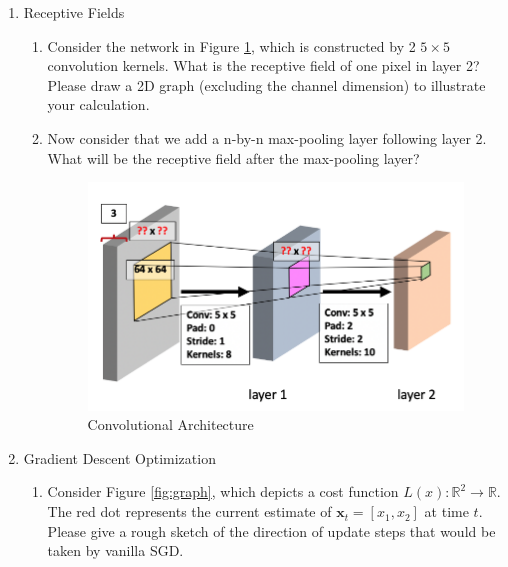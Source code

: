 \documentclass[a4paper]{article}
\begin{document}
\begin{enumerate}
		
		\newpage
		\item Receptive Fields
		\begin{enumerate}
			\item Consider the network in Figure \ref{fig:conv}, which is constructed by 2 $5\times5$ convolution kernels. What is the receptive field of one pixel in layer 2? Please draw a 2D graph (excluding the channel dimension) to illustrate your calculation.
			
			\item Now consider that we add a n-by-n max-pooling layer following layer 2. What will be the receptive field after the max-pooling layer?
			
			\begin{figure}[h]
				\centering
				\includegraphics[scale=0.25]{images/conv.png}
				\caption{Convolutional Architecture}
				\label{fig:conv}
			\end{figure}
			
		\end{enumerate}
		
		\newpage
		\item Gradient Descent Optimization
		\begin{enumerate}
			\item Consider Figure \ref{fig:graph}, which depicts a cost function $L(x): \mathbb{R}^2 \rightarrow \mathbb{R}$. The red dot represents the current estimate of $\mathbf{x}_t = [x_1, x_2]$ at time $t$. Please give a rough sketch of the direction of update steps that would be taken by vanilla SGD.
			

\end{enumerate}
\end{enumerate}
\end{document}
